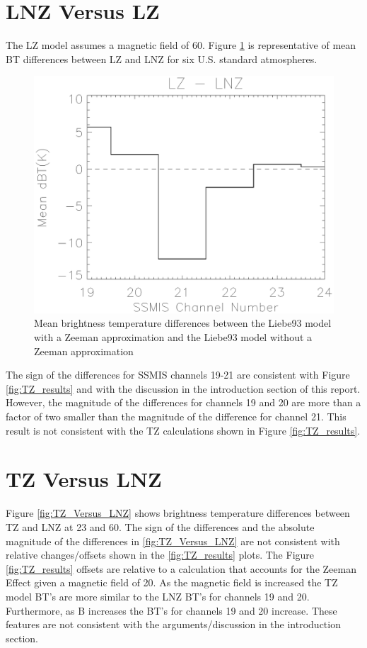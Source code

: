 \newpage
\section{LNZ Versus LZ}
The LZ model assumes a magnetic field of 60\microtesla. Figure \ref{fig:Liebe_Comparison} is representative of mean BT differences between
LZ and LNZ for six U.S. standard atmospheres. 
 
\begin{figure}[htp]
  \centering{}
  \includegraphics[scale=0.8]{./graphics/Liebe_Comparison.eps}
  \caption{Mean brightness temperature differences between the Liebe93 model with a Zeeman approximation and the Liebe93 model without a Zeeman approximation}
  \label{fig:Liebe_Comparison}
\end{figure}
 
The sign of the differences for SSMIS channels 19-21 are consistent with Figure \ref{fig:TZ_results} and with the discussion in the 
introduction section of this report. However, the magnitude of the differences for channels 19 and 20 are more than a factor of two smaller 
than the magnitude of the difference for channel 21.  
This result is not consistent with the TZ calculations shown in Figure \ref{fig:TZ_results}.
  
\newpage
\section{TZ Versus LNZ}

Figure \ref{fig:TZ_Versus_LNZ} shows brightness temperature differences between TZ and LNZ at 23\microtesla{} and 60\microtesla{}.
The sign of the differences and the absolute magnitude
of the differences in \ref{fig:TZ_Versus_LNZ} are not consistent with relative changes/offsets shown in the \ref{fig:TZ_results} plots. 
The Figure \ref{fig:TZ_results} offsets are relative to a calculation that accounts for the Zeeman Effect given a magnetic field of 20\microtesla{}.
As the magnetic field is increased the TZ model BT's are more similar to the LNZ BT's for channels 19 and 20. Furthermore, as B increases
the BT's for channels 19 and 20 increase.
These features are not consistent with the arguments/discussion in the introduction section.
   
